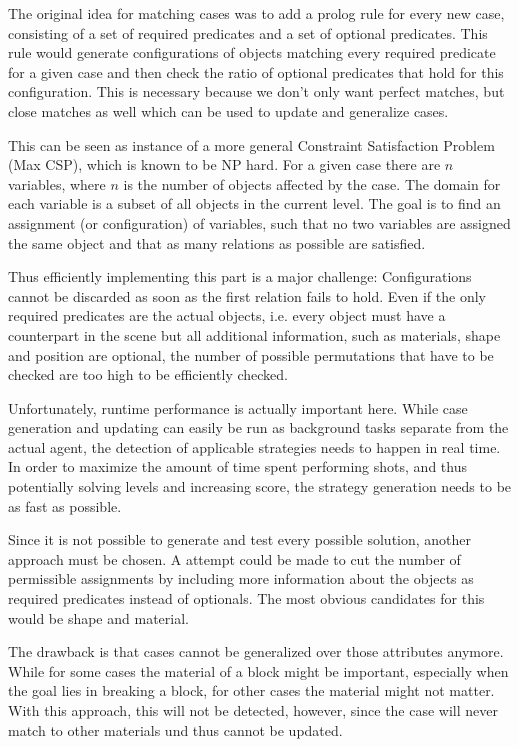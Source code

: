 The original idea for matching cases was to add a prolog rule for every new case, consisting of a set of required predicates and a set of optional predicates.
This rule would generate configurations of objects matching every required predicate for a given case and then check the ratio of optional predicates that hold for this configuration.
This is necessary because we don't only want perfect matches, but close matches as well which can be used to update and generalize cases.

This can be seen as instance of a more general Constraint Satisfaction Problem (Max CSP), which is known to be NP hard. For a given case there are $n$ variables, where $n$ is the number of objects affected by the case. The domain for each variable is a subset of all objects in the current level. The goal is to find an assignment (or configuration) of variables, such that no two variables are assigned the same object and that as many relations as possible are satisfied.

Thus efficiently implementing this part is a major challenge:
Configurations cannot be discarded as soon as the first relation fails to hold.
Even if the only required predicates are the actual objects, i.e. every object must have a counterpart in the scene but all additional information, such as materials, shape and position are optional, the number of possible permutations that have to be checked are too high to be efficiently checked.

Unfortunately, runtime performance is actually important here. While case generation and updating can easily be run as background tasks separate from the actual agent, the detection of applicable strategies needs to happen in real time.
In order to maximize the amount of time spent performing shots, and thus potentially solving levels and increasing score, the strategy generation needs to be as fast as possible.

Since it is not possible to generate and test every possible solution, another approach must be chosen. A attempt could be made to cut the number of permissible assignments by including more information about the objects as required predicates instead of optionals.
The most obvious candidates for this would be shape and material.

The drawback is that cases cannot be generalized over those attributes anymore. While for some cases the material of a block might be important, especially when the goal lies in breaking a block, for other cases the material might not matter.
With this approach, this will not be detected, however, since the case will never match to other materials und thus cannot be updated.

